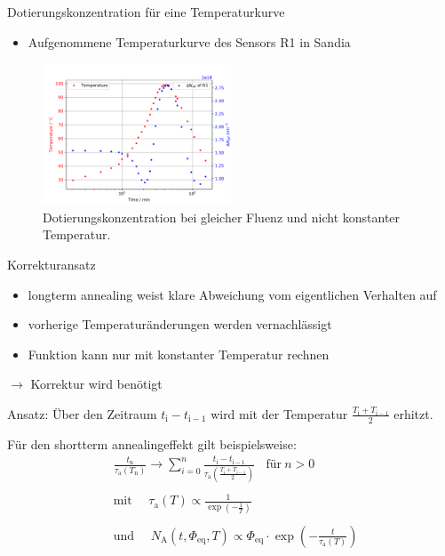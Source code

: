 \documentclass[aspectratio=1610, 9pt]{beamer}
\begin{document}
\begin{frame}{Dotierungskonzentration für eine Temperaturkurve}
  \begin{itemize}
    \item Aufgenommene Temperaturkurve des Sensors R1 in Sandia
  \end{itemize}
  \begin{figure}
      \includegraphics[width=0.5\textwidth]{images/ohnekorrektur.PDF}
  \caption{Dotierungskonzentration bei gleicher Fluenz und nicht konstanter Temperatur.}
  \end{figure}
\end{frame}

\begin{frame}{Korrekturansatz}
  \begin{itemize}
    \item longterm annealing weist klare Abweichung vom eigentlichen Verhalten auf
    \medskip
    \item vorherige Temperaturänderungen werden vernachlässigt
    \medskip
    \item Funktion kann nur mit konstanter Temperatur rechnen
  \end{itemize}
  \medskip
  $\rightarrow$ Korrektur wird benötigt
  \medskip

  Ansatz: Über den Zeitraum $t_{\mathrm{i}} - t_{\mathrm{i-1}}$ wird mit der Temperatur $\frac{T_{\mathrm{i}} +T_{\mathrm{i-1}}}{2}$ erhitzt.

  Für den shortterm annealingeffekt gilt beispielsweise:
  \begin{align*}
    &\frac{t_{\mathrm{n}}}{\tau_{\mathrm{a}}(T_{\mathrm{n}})} \rightarrow \sum_{i=0}^n  \frac{t_{\mathrm{i}} - t_{\mathrm{i-1}}}{\tau_{\mathrm{a}}(\frac{T_{\mathrm{i}} +T_{\mathrm{i-1}}}{2})} \:\:\:\: \text{für} \: n>0 \\
    \\
    &\text{mit} \:\:\:\:\:\: \tau_{\mathrm{a}}(T) \propto \frac{1}{\exp{\left(-\frac{1}{T}\right)}} \\
    \\
    &\text{und}  \:\:\:\:\:\: N_{\mathrm{A}}(t, \Phi_{\mathrm{eq}}, T)     \propto \Phi_{\mathrm{eq}} \cdot \exp{\left(-\frac{t}{\tau_{\mathrm{a}}(T)}\right) }
  \end{align*}
\end{frame}
\end{document}
